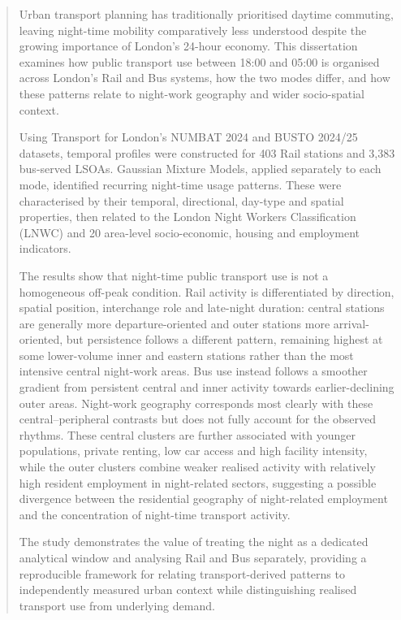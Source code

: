 \begin{abstract} %
\singlespacing
Urban transport planning has traditionally prioritised daytime commuting, leaving night-time mobility comparatively less understood despite the growing importance of London's 24-hour economy. This dissertation examines how public transport use between 18:00 and 05:00 is organised across London's Rail and Bus systems, how the two modes differ, and how these patterns relate to night-work geography and wider socio-spatial context.

Using Transport for London's NUMBAT 2024 and BUSTO 2024/25 datasets, temporal profiles were constructed for 403 Rail stations and 3,383 bus-served LSOAs. Gaussian Mixture Models, applied separately to each mode, identified recurring night-time usage patterns. These were characterised by their temporal, directional, day-type and spatial properties, then related to the London Night Workers Classification (LNWC) and 20 area-level socio-economic, housing and employment indicators.

The results show that night-time public transport use is not a homogeneous off-peak condition. Rail activity is differentiated by direction, spatial position, interchange role and late-night duration: central stations are generally more departure-oriented and outer stations more arrival-oriented, but persistence follows a different pattern, remaining highest at some lower-volume inner and eastern stations rather than the most intensive central night-work areas. Bus use instead follows a smoother gradient from persistent central and inner activity towards earlier-declining outer areas. Night-work geography corresponds most clearly with these central--peripheral contrasts but does not fully account for the observed rhythms. These central clusters are further associated with younger populations, private renting, low car access and high facility intensity, while the outer clusters combine weaker realised activity with relatively high resident employment in night-related sectors, suggesting a possible divergence between the residential geography of night-related employment and the concentration of night-time transport activity.

The study demonstrates the value of treating the night as a dedicated analytical window and analysing Rail and Bus separately, providing a reproducible framework for relating transport-derived patterns to independently measured urban context while distinguishing realised transport use from underlying demand.
\end{abstract}

